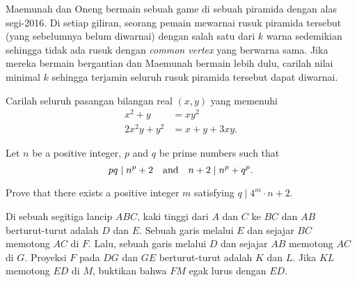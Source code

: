 \documentclass[11pt]{scrartcl}
\begin{document}
	
	
		
		\begin{soalbaru}
				Maemunah dan Oneng bermain sebuah game di sebuah piramida dengan alas segi-2016. Di setiap giliran, seorang pemain mewarnai rusuk piramida tersebut (yang sebelumnya belum diwarnai) dengan salah satu dari $k$ warna sedemikian sehingga tidak ada rusuk dengan \textit{common vertex} yang berwarna sama. Jika mereka bermain bergantian dan Maemunah bermain lebih dulu, carilah nilai minimal $k$ sehingga terjamin seluruh rusuk piramida tersebut dapat diwarnai.
				
				
			\end{soalbaru}

	\begin{soalbaru}
		Carilah seluruh pasangan bilangan real $(x, y)$ yang memenuhi
		\vspace{-10pt}
		\begin{align*} x^2+y&=xy^2 \\
		2x^2y+y^2&=x+y+3xy. 
		\end{align*}
	\end{soalbaru}

	\begin{soalbaru}
		Let $n$ be a positive integer, $p$ and $q$ be prime numbers such that
		\vspace{-10pt}
		\[ pq \mid n^p+2 \quad \text{and} \quad n+2 \mid n^p+q^p.\\[-12pt] \]
		
		Prove that there exists a positive integer $m$ satisfying $q \mid 4^m \cdot n +2$.
	\end{soalbaru}

	
	\begin{soalbaru}
	Di sebuah segitiga lancip $ABC$, kaki tinggi dari $A$ dan $C$ ke $BC$ dan $AB$ berturut-turut adalah $D$ dan $E$. Sebuah garis melalui $E$ dan sejajar $BC$ memotong $AC$ di $F$. Lalu, sebuah garis melalui $D$ dan sejajar $AB$ memotong $AC$ di $G$. Proyeksi $F$ pada $DG$ dan $GE$ berturut-turut adalah $K$ dan $L$. Jika $KL$ memotong $ED$ di $M$, buktikan bahwa $FM$ egak lurus dengan $ED$.
	\end{soalbaru}


	
\end{document}
